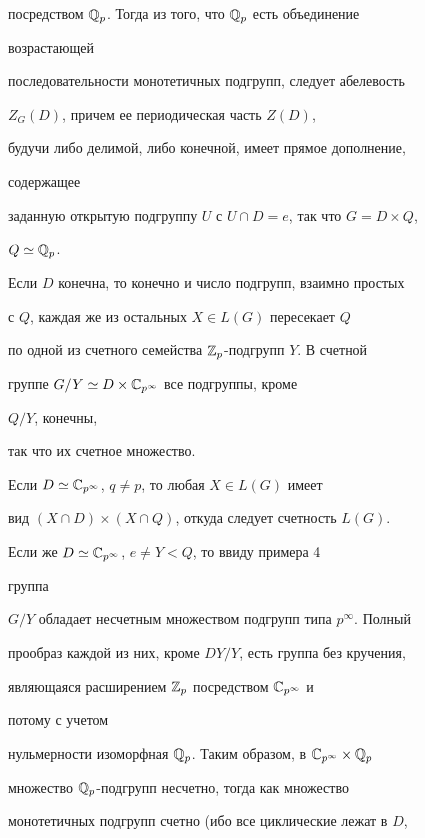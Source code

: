 посредством $\Bbb Q_p$. Тогда из того, что $\Bbb Q_p$ есть объединение 


возрастающей 


последовательности монотетичных подгрупп, следует абелевость 


$Z_G(D)$, причем ее периодическая часть $Z(D)$, 


будучи либо делимой, либо конечной, имеет прямое дополнение, 


содержащее 


заданную открытую подгруппу $U$ с $U\cap D=e$, так что $G=D\times Q$, 


$Q\simeq\Bbb Q_p$. 


 


Если $D$ конечна, то конечно и число подгрупп, взаимно простых 


с $Q$, каждая же из остальных $X\in L(G)$ пересекает $Q$ 


по одной из счетного семейства $\Bbb Z_p$-подгрупп $Y$. В счетной 


группе $G/Y\simeq D\times\Bbb C_{p^\infty}$ все подгруппы, кроме 


$Q/Y$, конечны, 


так что их счетное множество. 


 


Если $D\simeq\Bbb C_{p^\infty}$, $q\ne p$, то любая $X\in L(G)$ имеет  


вид $(X\cap D)\times(X\cap Q)$, откуда следует счетность $L(G)$. 


 


Если же $D\simeq\Bbb C_{p^\infty}$, $e\ne Y<Q$, то ввиду примера 4 


группа 


$G/Y$ обладает несчетным множеством подгрупп типа $p^\infty$. Полный  


прообраз каждой из них, кроме $DY/Y$, есть группа без кручения,  


являющаяся расширением $\Bbb Z_p$ посредством $\Bbb C_{p^\infty}$ и 


потому с учетом 


нульмерности изоморфная $\Bbb Q_p$. Таким образом, в $\Bbb 


C_{p^\infty}\times\Bbb Q_p$ 


множество $\Bbb Q_p$-подгрупп несчетно, тогда как множество 


монотетичных подгрупп счетно (ибо все циклические лежат в $D$,  


